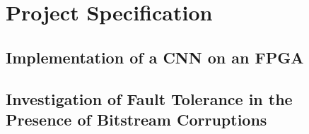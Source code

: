 \documentclass[11pt]{article}
\begin{document}
\section{Project Specification}
\label{sec:ProjectSpecification}

\subsection{Implementation of a CNN on an FPGA}
\label{sec:ImplementationOfACNNOnAnFPGA}



\subsection{Investigation of Fault Tolerance in the Presence of Bitstream Corruptions}
\label{sec:InvestigationOfFaultToleranceInThePresenceOfBitstreamCorruptions}
\end{document}
